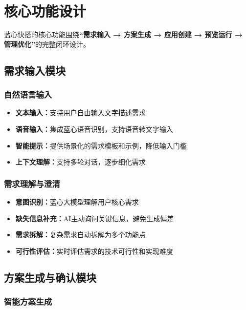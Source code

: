 \documentclass[a4paper,12pt]{ctexart}
\newcommand{\highlight}[1]{\textcolor{vivoblue}{\textbf{#1}}}
\begin{document}
\section{核心功能设计}

蓝心快搭的核心功能围绕\highlight{``需求输入 → 方案生成 → 应用创建 → 预览运行 → 管理优化''}的完整闭环设计。

\subsection{需求输入模块}

\subsubsection{自然语言输入}

\begin{itemize}[leftmargin=2em]
    \item \textbf{文本输入：}支持用户自由输入文字描述需求
    \item \textbf{语音输入：}集成蓝心语音识别，支持语音转文字输入
    \item \textbf{智能提示：}提供场景化的需求模板和示例，降低输入门槛
    \item \textbf{上下文理解：}支持多轮对话，逐步细化需求
\end{itemize}

\subsubsection{需求理解与澄清}

\begin{itemize}[leftmargin=2em]
    \item \textbf{意图识别：}蓝心大模型理解用户核心需求
    \item \textbf{缺失信息补充：}AI主动询问关键信息，避免生成偏差
    \item \textbf{需求拆解：}复杂需求自动拆解为多个功能点
    \item \textbf{可行性评估：}实时评估需求的技术可行性和实现难度
\end{itemize}

\subsection{方案生成与确认模块}

\subsubsection{智能方案生成}
\end{document}

